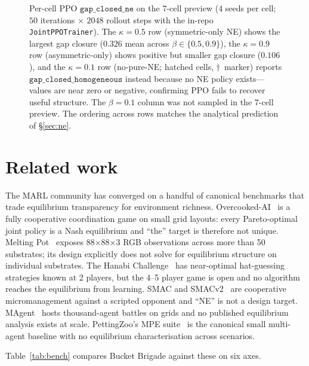 \documentclass{anvil-paper}
\begin{document}
\begin{figure}[t]
  \centering
  
  \caption{Per-cell PPO $\texttt{gap\_closed\_ne}$ on the 7-cell preview
  ($4$ seeds per cell; $50$ iterations $\times$ $2048$ rollout steps with
  the in-repo \texttt{JointPPOTrainer}). The $\kappa{=}0.5$ row
  (symmetric-only NE) shows the largest gap closure ($0.326$ mean across
  $\beta\in\{0.5,0.9\}$), the $\kappa{=}0.9$ row (asymmetric-only) shows
  positive but smaller gap closure ($0.106$), and the $\kappa{=}0.1$ row
  (no-pure-NE; hatched cells, $\dagger$~marker) reports
  $\texttt{gap\_closed\_homogeneous}$ instead because no NE policy
  exists---values are near zero or negative, confirming PPO fails to
  recover useful structure. The $\beta{=}0.1$ column was not sampled in
  the 7-cell preview. The ordering across rows matches the analytical
  prediction of \S\ref{sec:ne}.}
  \label{fig:ppo}
\end{figure}

\section{Related work}
\label{sec:related}

The MARL community has converged on a handful of canonical benchmarks that
trade equilibrium transparency for environment richness.
Overcooked-AI~\citep{overcooked2019} is a fully cooperative coordination
game on small grid layouts: every Pareto-optimal joint policy is a Nash
equilibrium and ``the'' target is therefore not unique. Melting
Pot~\citep{meltingpot2021} exposes 88$\times$88$\times$3 RGB observations
across more than 50 substrates; its design explicitly does not solve for
equilibrium structure on individual substrates. The Hanabi
Challenge~\citep{hanabi2020} has near-optimal hat-guessing strategies known
at 2 players, but the 4--5 player game is open and no algorithm reaches the
equilibrium from learning. SMAC and SMACv2~\citep{smac2019,smacv2_2023} are
cooperative micromanagement against a scripted opponent and ``NE'' is not a
design target. MAgent~\citep{magent2018} hosts thousand-agent battles on
grids and no published equilibrium analysis exists at scale.
PettingZoo's MPE suite~\citep{pettingzoo2021} is the canonical small
multi-agent baseline with no equilibrium characterisation across scenarios.

Table~\ref{tab:bench} compares Bucket Brigade against these on six axes.
\end{document}
